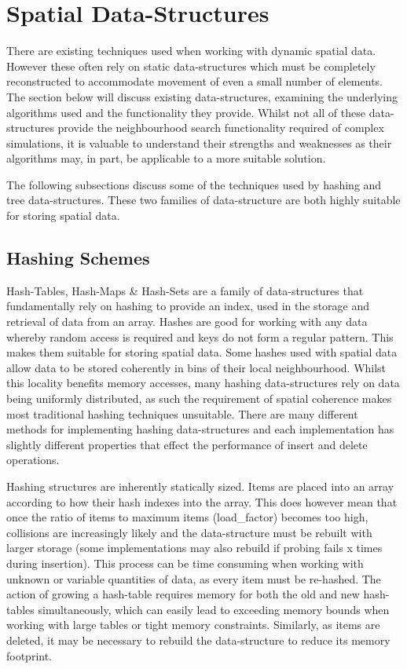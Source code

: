 \section{Spatial Data-Structures\label{sec:serial-spatial}}
  There are existing techniques used when working with dynamic spatial data. However these often rely on static data-structures which must be completely reconstructed to accommodate movement of even a small number of elements. The section below will discuss existing data-structures, examining the underlying algorithms used and the functionality they provide. Whilst not all of these data-structures provide the neighbourhood search functionality required of complex simulations, it is valuable to understand their strengths and weaknesses as their algorithms may, in part, be applicable to a more suitable solution.
  
  The following subsections discuss some of the techniques used by hashing and tree data-structures. These two families of data-structure are both highly suitable for storing spatial data.
  
  \subsection{Hashing Schemes\label{subsec:hashing-schemes}}
    Hash-Tables, Hash-Maps \& Hash-Sets are a family of data-structures that fundamentally rely on hashing to provide an index, used in the storage and retrieval of data from an array. Hashes are good for working with any data whereby random access is required and keys do not form a regular pattern. This makes them suitable for storing spatial data. Some hashes used with spatial data allow data to be stored coherently in bins of their local neighbourhood. Whilst this locality benefits memory accesses, many hashing data-structures rely on data being uniformly distributed, as such the requirement of spatial coherence makes most traditional hashing techniques unsuitable. There are many different methods for implementing hashing data-structures and each implementation has slightly different properties that effect the performance of insert and delete operations.
    
    Hashing structures are inherently statically sized. Items are placed into an array according to how their hash indexes into the array. This does however mean that once the ratio of items to maximum items (\gls{load_factor}) becomes too high, collisions are increasingly likely and the data-structure must be rebuilt with larger storage (some implementations may also rebuild if probing fails x times during insertion). This process can be time consuming when working with unknown or variable quantities of data, as every item must be re-hashed. The action of growing a hash-table requires memory for both the old and new hash-tables simultaneously, which can easily lead to exceeding memory bounds when working with large tables or tight memory constraints. Similarly, as items are deleted, it may be necessary to rebuild the data-structure to reduce its memory footprint.
    
